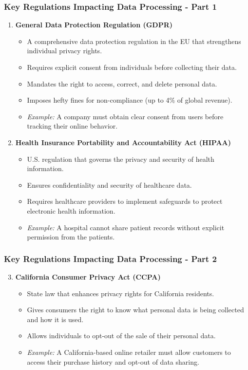\documentclass[aspectratio=169]{beamer}
\begin{document}
\begin{frame}[fragile]
    \frametitle{Key Regulations Impacting Data Processing - Part 1}
    \begin{enumerate}
        \item \textbf{General Data Protection Regulation (GDPR)}
        \begin{itemize}
            \item A comprehensive data protection regulation in the EU that strengthens individual privacy rights.
            \item Requires explicit consent from individuals before collecting their data.
            \item Mandates the right to access, correct, and delete personal data.
            \item Imposes hefty fines for non-compliance (up to 4\% of global revenue).
            \item \textit{Example:} A company must obtain clear consent from users before tracking their online behavior.
        \end{itemize}
        
        \item \textbf{Health Insurance Portability and Accountability Act (HIPAA)}
        \begin{itemize}
            \item U.S. regulation that governs the privacy and security of health information.
            \item Ensures confidentiality and security of healthcare data.
            \item Requires healthcare providers to implement safeguards to protect electronic health information.
            \item \textit{Example:} A hospital cannot share patient records without explicit permission from the patients.
        \end{itemize}
    \end{enumerate}
\end{frame}

\begin{frame}[fragile]
    \frametitle{Key Regulations Impacting Data Processing - Part 2}
    \begin{enumerate}
        \setcounter{enumi}{2}
        \item \textbf{California Consumer Privacy Act (CCPA)}
        \begin{itemize}
            \item State law that enhances privacy rights for California residents.
            \item Gives consumers the right to know what personal data is being collected and how it is used.
            \item Allows individuals to opt-out of the sale of their personal data.
            \item \textit{Example:} A California-based online retailer must allow customers to access their purchase history and opt-out of data sharing.
        \end{itemize}
    \end{enumerate}
\end{frame}
\end{document}
